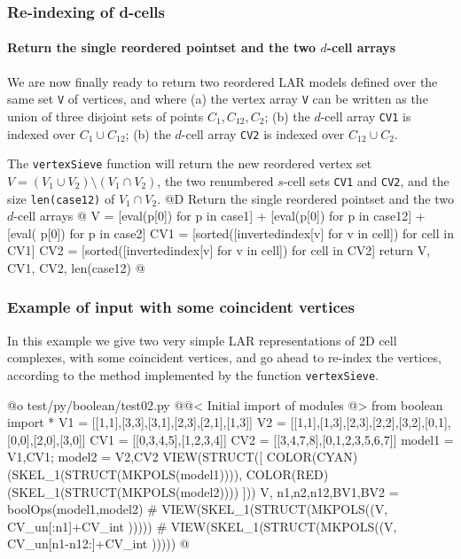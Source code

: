 \documentclass[11pt,oneside]{article}	%
\begin{document}
\subsubsection{Re-indexing of d-cells}

\paragraph{Return the single reordered pointset and the two $d$-cell arrays}
We are now finally ready to return two reordered LAR models defined over the same set \texttt{V} of vertices, and where (a) the vertex array \texttt{V} can be written as the union of three disjoint sets of points $C_1,C_{12},C_2$; (b) the $d$-cell array \texttt{CV1} is indexed over $C_1\cup C_{12}$; (b) the $d$-cell array \texttt{CV2} is indexed over $C_{12}\cup C_{2}$. 

The \texttt{vertexSieve} function will return the new reordered vertex set $V = (V_1 \cup V_2) \setminus (V_1 \cap V_2)$, the two renumbered $s$-cell sets \texttt{CV1} and \texttt{CV2}, and the size \texttt{len(case12)} of $V_1 \cap V_2$.
@D Return the single reordered pointset and the two $d$-cell arrays
@{
	V = [eval(p[0]) for p in case1] + [eval(p[0]) for p in case12] + [eval(
				p[0]) for p in case2]
	CV1 = [sorted([invertedindex[v] for v in cell]) for cell in CV1]
	CV2 = [sorted([invertedindex[v] for v in cell]) for cell in CV2]
	return V, CV1, CV2, len(case12)
@}


\subsubsection{Example of input with some coincident vertices}
In this example we give two very simple LAR representations of 2D cell complexes, with some coincident vertices, and go ahead to re-index the vertices, according to the method implemented by the function \texttt{vertexSieve}.

@o test/py/boolean/test02.py
@{@< Initial import of modules @>
from boolean import *
V1 = [[1,1],[3,3],[3,1],[2,3],[2,1],[1,3]]
V2 = [[1,1],[1,3],[2,3],[2,2],[3,2],[0,1],[0,0],[2,0],[3,0]]
CV1 = [[0,3,4,5],[1,2,3,4]]
CV2 = [[3,4,7,8],[0,1,2,3,5,6,7]]
model1 = V1,CV1; model2 = V2,CV2
VIEW(STRUCT([ 
	COLOR(CYAN)(SKEL_1(STRUCT(MKPOLS(model1)))), 
	COLOR(RED)(SKEL_1(STRUCT(MKPOLS(model2)))) ]))
V, n1,n2,n12,BV1,BV2 = boolOps(model1,model2)
# VIEW(SKEL_1(STRUCT(MKPOLS((V, CV_un[:n1]+CV_int )))))
# VIEW(SKEL_1(STRUCT(MKPOLS((V, CV_un[n1-n12:]+CV_int )))))
@}
\end{document}
